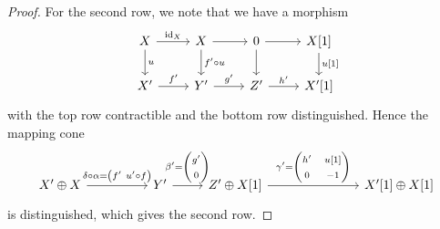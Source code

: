 \documentclass[dissertation.tex]{subfiles}
\begin{document}
\begin{prop}
\begin{proof}
  For the second row, we note that we have a morphism
  $$\begin{tikzcd}
    X \arrow{r}{\id_X}\arrow{d}{u} & X \arrow{r}\arrow{d}{f^\prime \circ u} & 0 \arrow{r}\arrow{d} & X[1]\arrow{d}{u[1]}\\
      X^\prime \arrow{r}{f^\prime} & Y^\prime \arrow{r}{g^\prime} & Z^\prime \arrow{r}{h^\prime} & X^\prime[1]
  \end{tikzcd}$$
  with the top row contractible and the bottom row distinguished.
  Hence the mapping cone
  $$\begin{tikzcd}[ampersand replacement=\&]
    X^\prime \oplus X \arrow{rr}{\delta \circ \alpha = \left(f^\prime\ u^\prime \circ f\right)} 
    \& \& Y^\prime \arrow{r}{\beta^\prime = \left(\begin{matrix}g^\prime\\0\end{matrix}\right)}
    \& Z^\prime \oplus X[1] 
    \arrow{rrr}{\gamma^\prime = \left(\begin{matrix}h^\prime & u[1]\\0 & -1\end{matrix}\right)}
    \& \& \& X^\prime[1] \oplus X[1]
  \end{tikzcd}$$
  is distinguished, which gives the second row.
  

\end{proof}
\end{prop}
\end{document}
